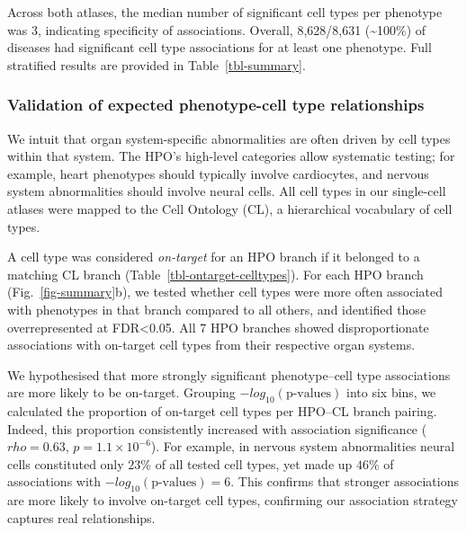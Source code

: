 \documentclass[
]{article}
\begin{document}
Across both atlases, the median number of significant cell types per
phenotype was 3, indicating specificity of associations. Overall,
8,628/8,631 (\textasciitilde100\%) of diseases had significant cell type
associations for at least one phenotype. Full stratified results are
provided in Table~\ref{tbl-summary}.

\subsubsection{Validation of expected phenotype-cell type
relationships}\label{validation-of-expected-phenotype-cell-type-relationships}

We intuit that organ system-specific abnormalities are often driven by
cell types within that system. The HPO's high-level categories allow
systematic testing; for example, heart phenotypes should typically
involve cardiocytes, and nervous system abnormalities should involve
neural cells. All cell types in our single-cell atlases were mapped to
the Cell Ontology (CL), a hierarchical vocabulary of cell types.

A cell type was considered \emph{on-target} for an HPO branch if it
belonged to a matching CL branch (Table~\ref{tbl-ontarget-celltypes}).
For each HPO branch (Fig.~\ref{fig-summary}b), we tested whether cell
types were more often associated with phenotypes in that branch compared
to all others, and identified those overrepresented at FDR\textless0.05.
All 7 HPO branches showed disproportionate associations with on-target
cell types from their respective organ systems.

We hypothesised that more strongly significant phenotype--cell type
associations are more likely to be on-target. Grouping
\(-log_{10}(\text{p-values})\) into six bins, we calculated the
proportion of on-target cell types per HPO--CL branch pairing. Indeed,
this proportion consistently increased with association significance
(\(rho=\)\(0.63\), \(p=\)\(1.1 \times 10^{-6}\)). For example, in
nervous system abnormalities neural cells constituted only \(23\)\% of
all tested cell types, yet made up \(46\)\% of associations with
\(-log_{10}(\text{p-values}) = 6\). This confirms that stronger
associations are more likely to involve on-target cell types, confirming
our association strategy captures real relationships.
\end{document}
